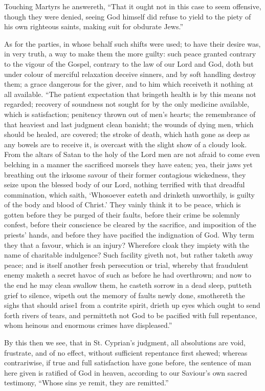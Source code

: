 Touching Martyrs he answereth, “That it ought not in this case to seem offensive, though they were denied, seeing God himself did refuse to yield to the piety of his own righteous saints, making suit for obdurate Jews.”

As for the parties, in whose behalf such shifts were used; to have their desire was, in very truth, a way to make them the more guilty: such peace granted contrary to the vigour of the Gospel, contrary to the law of our Lord and God, doth but under colour of merciful relaxation deceive sinners, and by soft handling destroy them; a grace dangerous for the giver, and to him which receiveth it nothing at all available. “The patient expectation that bringeth health is by this means not regarded; recovery of soundness not sought for  by the only medicine available, which is satisfaction; penitency thrown out of men’s hearts; the remembrance of that heaviest and last judgment clean banisht; the wounds of dying men, which should be healed, are covered; the stroke of death, which hath gone as deep as any bowels are to receive it, is overcast with the slight show of a cloudy look. From the altars of Satan to the holy of the Lord men are not afraid to come even belching in a manner the sacrificed morsels they have eaten; yea, their jaws yet breathing out the irksome savour of their former contagious wickedness, they seize upon the blessed body of our Lord, nothing terrified with that dreadful commination, which saith, ‘Whosoever eateth and drinketh unworthily, is guilty of the body and blood of Christ.’ They vainly think it to be peace, which is gotten before they be purged of their faults, before their crime be solemnly confest, before their conscience be cleared by the sacrifice, and imposition of the priests’ hands, and before they have pacified the indignation of God. Why term they that a favour, which is an injury? Wherefore cloak they impiety with the name of charitable indulgence? Such facility giveth not, but rather taketh away peace; and is itself another fresh persecution or trial, whereby that fraudulent enemy maketh a secret havoc of such as before he had overthrown; and now to the end he may clean swallow them, he casteth sorrow in a dead sleep, putteth grief to silence, wipeth out the memory of faults newly done, smothereth the sighs that should arise1 from a contrite spirit, drieth up eyes which ought to send forth rivers of tears, and permitteth not God to be pacified with full repentance, whom heinous and enormous crimes have displeased.”

By this then we see, that in St. Cyprian’s judgment, all absolutions are void, frustrate, and of no effect, without sufficient repentance first shewed; whereas contrariwise, if true and full satisfaction have gone before, the sentence of man here given is ratified of God in heaven, according to our Saviour’s own sacred testimony, “Whose sins ye remit, they are remitted.”


